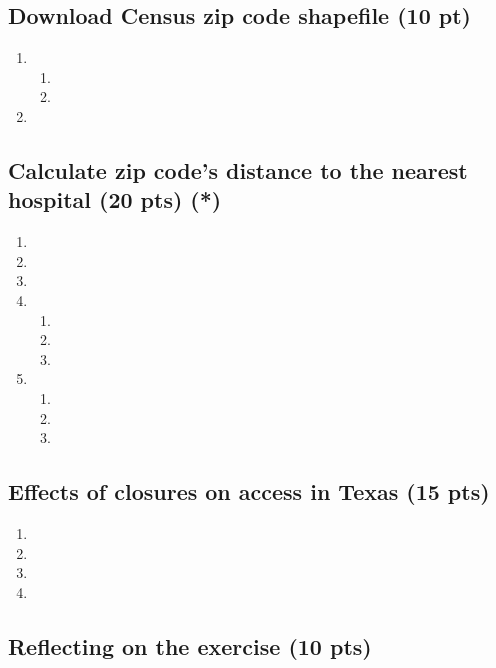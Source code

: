 \documentclass[
  letterpaper,
  DIV=11,
  numbers=noendperiod]{scrartcl}
\providecommand{\tightlist}{%
  \setlength{\itemsep}{0pt}\setlength{\parskip}{0pt}}\usepackage{longtable,booktabs,array}
\begin{document}
\subsection{Download Census zip code shapefile (10
pt)}\label{download-census-zip-code-shapefile-10-pt}

\begin{enumerate}
\def\labelenumi{\arabic{enumi}.}
\tightlist
\item
  \begin{enumerate}
  \def\labelenumii{\alph{enumii}.}
  \tightlist
  \item
  \item
  \end{enumerate}
\item
\end{enumerate}

\subsection{Calculate zip code's distance to the nearest hospital (20
pts)
(*)}\label{calculate-zip-codes-distance-to-the-nearest-hospital-20-pts}

\begin{enumerate}
\def\labelenumi{\arabic{enumi}.}
\tightlist
\item
\item
\item
\item
  \begin{enumerate}
  \def\labelenumii{\alph{enumii}.}
  \tightlist
  \item
  \item
  \item
  \end{enumerate}
\item
  \begin{enumerate}
  \def\labelenumii{\alph{enumii}.}
  \tightlist
  \item
  \item
  \item
  \end{enumerate}
\end{enumerate}

\subsection{Effects of closures on access in Texas (15
pts)}\label{effects-of-closures-on-access-in-texas-15-pts}

\begin{enumerate}
\def\labelenumi{\arabic{enumi}.}
\tightlist
\item
\item
\item
\item
\end{enumerate}

\subsection{Reflecting on the exercise (10
pts)}\label{reflecting-on-the-exercise-10-pts}
\end{document}
